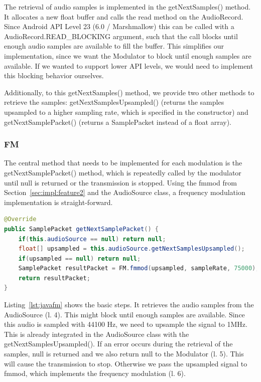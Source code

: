 The retrieval of audio samples is implemented in the getNextSamples() method. It allocates a new float buffer and calls the read method on the AudioRecord. Since Android API Level 23 (6.0 / Marshmallow) this can be called with a AudioRecord.READ\_BLOCKING argument, such that the call blocks until enough audio samples are available to fill the buffer. This simplifies our implementation, since we want the Modulator to block until enough samples are available. If we wanted to support lower API levels, we would need to implement this blocking behavior ourselves.

Additionally, to this getNextSamples() method, we provide two other methods to retrieve the samples: getNextSamplesUpsampled() (returns the samples upsampled to a higher sampling rate, which is specified in the constructor) and  getNextSamplePacket() (returns a SamplePacket instead of a float array).

\subsubsection{FM}

The central method that needs to be implemented for each modulation is the getNextSamplePacket() method, which is repeatedly called by the modulator until null is returned or the transmission is stopped. Using the fmmod from Section~\ref{sec:impl:feature2} and the AudioSource class, a frequency modulation implementation is straight-forward. 

\begin{lstlisting}[label=lst:javafm, caption=Modulating Microphone Samples using Frequency Modulation, language=java,]
@Override
public SamplePacket getNextSamplePacket() {
	if(this.audioSource == null) return null;
	float[] upsampled = this.audioSource.getNextSamplesUpsampled();
	if(upsampled == null) return null;
	SamplePacket resultPacket = FM.fmmod(upsampled, sampleRate, 75000);
	return resultPacket;
}
\end{lstlisting}

Listing~\ref{lst:javafm} shows the basic steps. It retrieves the audio samples from the AudioSource (l. 4). This might block until enough samples are available. Since this audio is sampled with 44100 Hz, we need to upsample the signal to 1MHz. This is already integrated in the AudioSource class with the getNextSamplesUpsampled(). If an error occurs during the retrieval of the samples, null is returned and we also return null to the Modulator (l. 5). This will cause the transmission to stop. Otherwise we pass the upsampled signal to fmmod, which implements the frequency modulation (l. 6). 


